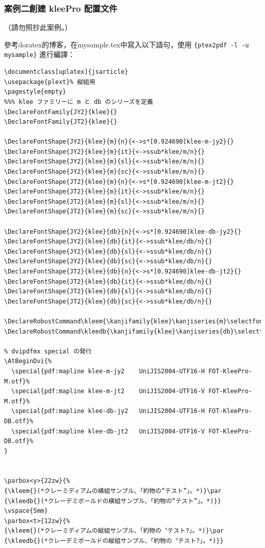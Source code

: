 \subsubsection*{案例二創建 {kleePro} 配置文件}

（請勿照抄此案例。）

\par{}參考{doratex}的博客，在{mysample.tex}中寫入以下語句，使用
{\color{red}\verb+{ptex2pdf -l -u  mysample}+}
進行編譯：
\begin{lstlisting}[firstnumber=1]
%#!使用uplatex 編譯
\documentclass[uplatex]{jsarticle}
\usepackage{plext}% 縦組用
\pagestyle{empty}
%%% klee ファミリーに m と db のシリーズを定義
\DeclareFontFamily{JY2}{klee}{}
\DeclareFontFamily{JT2}{klee}{}

\DeclareFontShape{JY2}{klee}{m}{n}{<->s*[0.924690]klee-m-jy2}{}
\DeclareFontShape{JY2}{klee}{m}{it}{<->ssub*klee/m/n}{}
\DeclareFontShape{JY2}{klee}{m}{sl}{<->ssub*klee/m/n}{}
\DeclareFontShape{JY2}{klee}{m}{sc}{<->ssub*klee/m/n}{}
\DeclareFontShape{JT2}{klee}{m}{n}{<->s*[0.924690]klee-m-jt2}{}
\DeclareFontShape{JT2}{klee}{m}{it}{<->ssub*klee/m/n}{}
\DeclareFontShape{JT2}{klee}{m}{sl}{<->ssub*klee/m/n}{}
\DeclareFontShape{JT2}{klee}{m}{sc}{<->ssub*klee/m/n}{}

\DeclareFontShape{JY2}{klee}{db}{n}{<->s*[0.924690]klee-db-jy2}{}
\DeclareFontShape{JY2}{klee}{db}{it}{<->ssub*klee/db/n}{}
\DeclareFontShape{JY2}{klee}{db}{sl}{<->ssub*klee/db/n}{}
\DeclareFontShape{JY2}{klee}{db}{sc}{<->ssub*klee/db/n}{}
\DeclareFontShape{JT2}{klee}{db}{n}{<->s*[0.924690]klee-db-jt2}{}
\DeclareFontShape{JT2}{klee}{db}{it}{<->ssub*klee/db/n}{}
\DeclareFontShape{JT2}{klee}{db}{sl}{<->ssub*klee/db/n}{}
\DeclareFontShape{JT2}{klee}{db}{sc}{<->ssub*klee/db/n}{}

\DeclareRobustCommand\kleem{\kanjifamily{klee}\kanjiseries{m}\selectfont}
\DeclareRobustCommand\kleedb{\kanjifamily{klee}\kanjiseries{db}\selectfont}

% dvipdfmx special の発行
\AtBeginDvi{%
  \special{pdf:mapline klee-m-jy2    UniJIS2004-UTF16-H FOT-KleePro-M.otf}%
  \special{pdf:mapline klee-m-jt2    UniJIS2004-UTF16-V FOT-KleePro-M.otf}%
  \special{pdf:mapline klee-db-jy2   UniJIS2004-UTF16-H FOT-KleePro-DB.otf}%
  \special{pdf:mapline klee-db-jt2   UniJIS2004-UTF16-V FOT-KleePro-DB.otf}%
}


\parbox<y>{22zw}{%
{\kleem{}(*クレーミディアムの横組サンプル、「約物の“テスト”」。*)}\par
{\kleedb{}(*クレーデミボールドの横組サンプル、「約物の“テスト”」。*)}}
\vspace{5mm}
\parbox<t>{12zw}{%
{\kleem{}(*クレーミディアムの縦組サンプル、「約物の〝テスト?」。*)}\par
{\kleedb{}(*クレーデミボールドの縦組サンプル、「約物の〝テスト?」。*)}}

\end{lstlisting}


